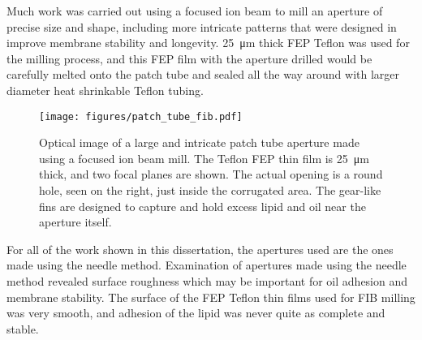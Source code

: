 Much work was carried out using a focused ion beam to mill an aperture of precise size and shape, including more intricate patterns that were designed in improve membrane stability and longevity.  \SI{25}{\um} thick FEP Teflon was used for the milling process, and this FEP film with the aperture drilled would be carefully melted onto the patch tube and sealed all the way around with larger diameter heat shrinkable Teflon tubing.

\begin{figure}[h]
\begin{centering}
\texttt{[image: figures/patch\_tube\_fib.pdf]}
\caption[Patch tube aperture milled using FIB]{Optical image of a large and intricate patch tube aperture made using a focused ion beam mill.  The Teflon FEP thin film is \SI{25}{\um} thick, and two focal planes are shown.  The actual opening is a round hole, seen on the right, just inside the corrugated area.  The gear-like fins are designed to capture and hold excess lipid and oil near the aperture itself.}
\label{fig:patch_tube_fib}
\end{centering}
\end{figure}

For all of the work shown in this dissertation, the apertures used are the ones made using the needle method.  Examination of apertures made using the needle method revealed surface roughness which may be important for oil adhesion and membrane stability.  The surface of the FEP Teflon thin films used for FIB milling was very smooth, and adhesion of the lipid was never quite as complete and stable.